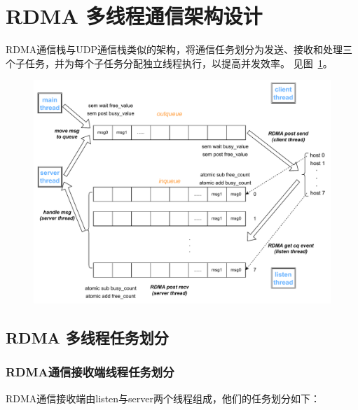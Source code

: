 {\begin{algorithm}
\begin{algorithmic}[1]
            \State {}
            \EndFor
            \EndIf
            \EndProcedure
        \end{algorithmic}
    \end{algorithm}

    \section{RDMA 多线程通信架构设计}\label{sec:RDMA 多线程通信架构设计}

    RDMA通信栈与UDP通信栈类似的架构，将通信任务划分为发送、接收和处理三个子任务，并为每个子任务分配独立线程执行，以提高并发效率。
    见图~\ref{fig:RDMA-communication-design}。

    \begin{figure}[H]
        \centering
        \includegraphics[width=1.0\textwidth]{Img/RDMA_design.drawio.pdf}
        \label{fig:RDMA-communication-design}
    \end{figure}


    \subsection{RDMA 多线程任务划分}

    \subsubsection{RDMA通信接收端线程任务划分}
    RDMA通信接收端由listen与server两个线程组成，他们的任务划分如下：

}
